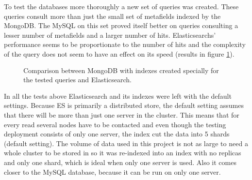 To test the databases more thoroughly a new set of queries was created. These queries consult more than just the 
small set of metafields indexed by the MongoDB. The MySQL on this set proved itself better on queries consulting
a lesser number of metafields and a larger number of hits. Elasticsearchs' performance seems to be proportionate
to the number of hits and the complexity of the query does not seem to have an effect on its speed (results in 
figure \ref{fig:wide}).

\begin{figure}[h]
	\centering
	
	\caption{Comparison between MongoDB with indexes created specially for the tested queries and Elasticsearch.}
	\label{fig:wide}
\end{figure}

In all the tests above Elasticsearch and its indexes were left with the default settings. Because ES is primarily 
a distributed store, the default setting assumes that there will be more than just one server in the cluster. This
means that for every read several nodes have to be contacted and even though the testing deployment consists of 
only one server, the index cut the data into 5 shards (default setting). The volume of data used 
in this project is not as large to need a whole cluster to be stored in so it was re-indexed into an index 
with no replicas and only one shard, which is ideal when only one server is used. Also it comes closer to the 
MySQL database, because it can be run on only one server. %